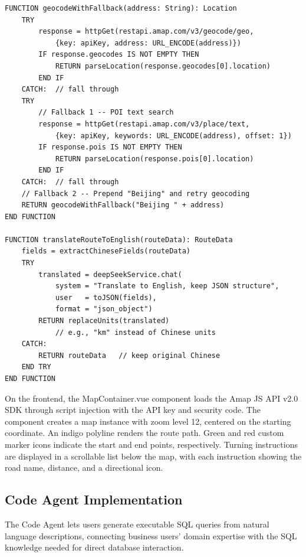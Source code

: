 \begin{table}[H]
\small\singlespacing
\centering
\caption{Pseudocode --- geocodeWithFallback() Multi-Level Address Resolution}
\label{tab:pseudocode-geocode}
\vspace{2mm}

\begin{lstlisting}
FUNCTION geocodeWithFallback(address: String): Location
    TRY
        response = httpGet(restapi.amap.com/v3/geocode/geo,
            {key: apiKey, address: URL_ENCODE(address)})
        IF response.geocodes IS NOT EMPTY THEN
            RETURN parseLocation(response.geocodes[0].location)
        END IF
    CATCH:  // fall through
    TRY
        // Fallback 1 -- POI text search
        response = httpGet(restapi.amap.com/v3/place/text,
            {key: apiKey, keywords: URL_ENCODE(address), offset: 1})
        IF response.pois IS NOT EMPTY THEN
            RETURN parseLocation(response.pois[0].location)
        END IF
    CATCH:  // fall through
    // Fallback 2 -- Prepend "Beijing" and retry geocoding
    RETURN geocodeWithFallback("Beijing " + address)
END FUNCTION

FUNCTION translateRouteToEnglish(routeData): RouteData
    fields = extractChineseFields(routeData)
    TRY
        translated = deepSeekService.chat(
            system = "Translate to English, keep JSON structure",
            user   = toJSON(fields),
            format = "json_object")
        RETURN replaceUnits(translated)
            // e.g., "km" instead of Chinese units
    CATCH:
        RETURN routeData   // keep original Chinese
    END TRY
END FUNCTION
\end{lstlisting}
\end{table}


On the frontend, the MapContainer.vue component loads the Amap JS API v2.0 SDK through script injection with the API key  and security code. The component creates a map instance with zoom level 12, centered on the starting coordinate. An indigo polyline renders the route path. Green and red custom marker icons indicate the start and end points, respectively. Turning instructions are displayed in a scrollable list below the map, with each instruction showing the road name, distance, and a directional icon.

\subsection{Code Agent Implementation}

The Code Agent lets users generate executable SQL queries from natural language descriptions, connecting business users' domain expertise with the SQL knowledge needed for direct database interaction.


